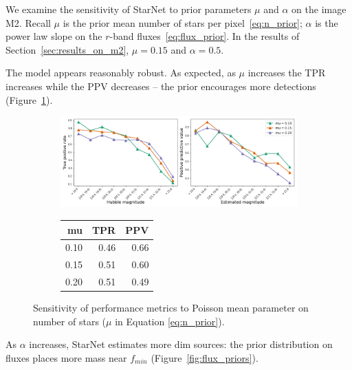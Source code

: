 
We examine the sensitivity of StarNet to prior parameters $\mu$ and $\alpha$ on the image M2. 
Recall $\mu$ is the prior mean number of stars per pixel~\eqref{eq:n_prior};
$\alpha$ is the power law slope on the $r$-band fluxes~\eqref{eq:flux_prior}. 
In the results of Section~\ref{sec:results_on_m2}, $\mu=0.15$ and  $\alpha = 0.5$. 

The model appears reasonably robust. 
As expected, as $\mu$ increases the TPR increases while the PPV decreases  -- the prior encourages more detections (Figure~\ref{fig:mu_sensitivity}). 

\begin{figure}[ht]
\begin{subfigure}{\textwidth}
\centering
\includegraphics[width = \textwidth]{figures/prior_sensitivity/prior_mu_sensitivty.png}
\end{subfigure}
\begin{subfigure}{\textwidth}
\begin{center}
\begin{tabular}{rrr}
\toprule
     mu &   TPR &   PPV \\
\midrule
 0.10 &  0.46 &  0.66 \\
 0.15 &  0.51 &  0.60 \\
 0.20 &  0.51 &  0.49 \\
\bottomrule
\end{tabular}
\par\vspace{0pt}
\end{center}
\end{subfigure}\hfill
\caption{Sensitivity of performance metrics to Poisson mean parameter on number of stars ($\mu$ in Equation \ref{eq:n_prior}). }
\label{fig:mu_sensitivity}
\end{figure}

As $\alpha$ increases, StarNet estimates more dim sources: the prior distribution on fluxes places more mass near $f_{min}$ (Figure~\ref{fig:flux_priors}). 

